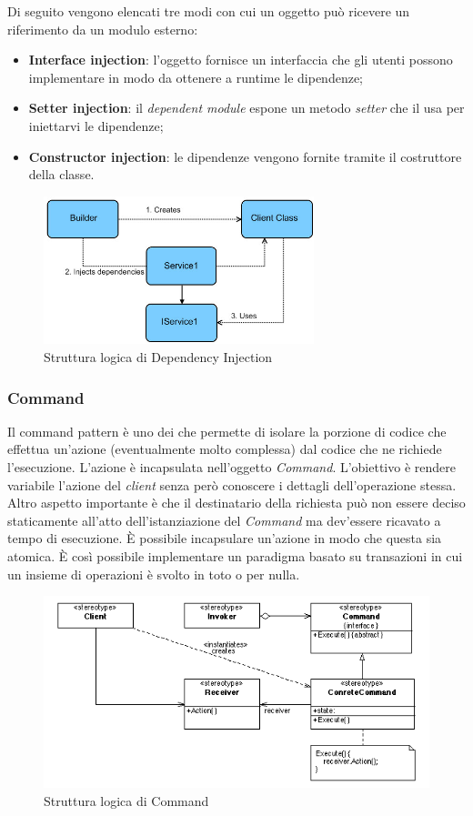 Di seguito vengono elencati tre modi con cui un oggetto può ricevere un riferimento da un modulo esterno:

\begin{itemize}

	\item \textbf{Interface injection}: l'oggetto fornisce un interfaccia che gli utenti possono implementare in modo da ottenere a runtime le dipendenze;
	\item \textbf{Setter injection}: il \textit{dependent module} espone un metodo \textit{setter} che il  usa per iniettarvi le dipendenze;
	\item \textbf{Constructor injection}: le dipendenze vengono fornite tramite il costruttore della classe.

\end{itemize}

\begin{figure}[H]
\centering \includegraphics[width=0.7\textwidth]{patterns/dependency-injection.jpg}
\caption{Struttura logica di Dependency Injection}
\label{fig:strategy}
\end{figure}


\subsubsection{Command}

Il command pattern è uno dei  che permette di isolare la porzione di codice che effettua un'azione (eventualmente molto complessa) dal codice che ne richiede l'esecuzione. L'azione è incapsulata nell'oggetto \textit{Command}. L'obiettivo è rendere variabile l'azione del \textit{client} senza però conoscere i dettagli dell'operazione stessa. Altro aspetto importante è che il destinatario della richiesta può non essere deciso staticamente all'atto dell'istanziazione del \textit{Command} ma dev'essere ricavato a tempo di esecuzione. È possibile incapsulare un'azione in modo che questa sia atomica. È così possibile implementare un paradigma basato su transazioni in cui un insieme di operazioni è svolto in toto o per nulla.

\begin{figure}[H]
\centering \includegraphics[width=\textwidth]{patterns/command.png}
\caption{Struttura logica di Command}
\label{fig:strategy}
\end{figure}
